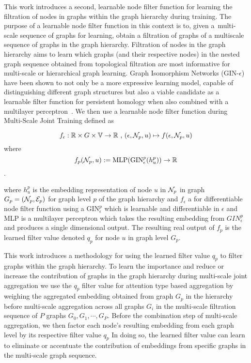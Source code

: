 This work introduces a second, learnable node filter function for learning the filtration of nodes in graphs within the graph hierarchy during training. The purpose of a learnable node filter function in this context is to, given a multi-scale sequence of graphs for learning, obtain a filtration of graphs of a multiscale sequence of graphs in the graph hierarchy. Filtration of nodes in the graph hierarchy aims to learn which graphs (and their respective nodes) in the nested graph sequence obtained from topological filtration are most informative for multi-scale or hierarchical graph learning. Graph Isomorphism Networks (GIN-$\epsilon$) have been shown to not only be a more expressive learning model, capable of distinguishing different graph structures but also a viable candidate as a learnable filter function for persistent homology when also combined with a multilayer perceptron~\cite{hofer2020graph,xu2018powerful}. We then use a learnable node filter function during Multi-Scale Joint Training defined as 

\[ f_{\epsilon} : \mathbb{R} \times G \times \mathbb{V} \to \mathbb{R}\text{ , }(\epsilon, \mathcal{N}_p, u) \mapsto f( \epsilon, \mathcal{N}_p, u)\]
where
\[f_p( \mathcal{N}_p, u):= \text{MLP}(\text{GIN}^p_{\epsilon}(h^p_u))\to\mathbb{R}\]. 

where $h^p_u$ is the embedding representation of node $u$ in $\mathcal{N}_p$ in graph $G_p=(\mathcal{N}_p, \mathcal{E}_p)$ for graph level $p$ of the graph hierarchy and  $f_\epsilon$ a for differentiable node filter function using a $\text{GIN}^p_{\epsilon}$ which is learnable and differentiable in $\epsilon$ and MLP is a multilayer perceptron which takes the resulting embedding from $GIN_{\epsilon}^p$ and produces a single dimensional output. The resulting real output of $f_p$ is the learned filter value denoted $q_p$ for node $u$ in graph level $G_p$.

This work introduces a methodology for using the learned filter value $q_p$ to filter graphs within the graph hierarchy. To learn the importance and reduce or increase the contribution of graphs in the graph hierarchy during multi-scale joint aggregation we use the $q_p$ filter value for attention type based aggregation by weighing the aggregated embedding obtained from graph $G_p$ in the hierarchy before multi-scale aggregation across all graphs $G_i$ in the multi-scale filtration sequence of $P$ graphs $G_0,G_1,\cdots ,G_P$.   Before the combination step of multi-scale aggregation, we then factor each node's resulting embedding from each graph level by its respective filter value $q_p$ In doing so, the learned filter value can learn to eliminate or accentuate the contribution of embeddings from specific graphs in the multi-scale graph sequence.

